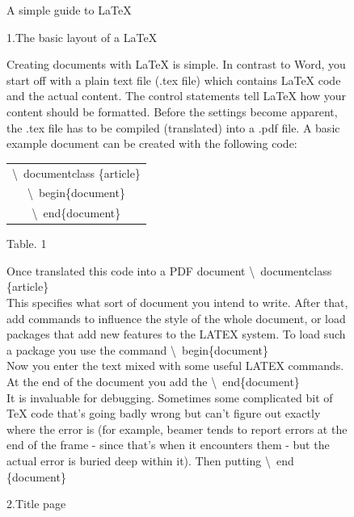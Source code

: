 \documentclass[onecolumn,journal] {IEEEtran}
\begin{document}
\begin{figure}

\begin{Large}
 A simple guide to LaTeX
\end{Large}
\newline
\newline
\begin{Large}
1.The basic layout of a LaTeX
\end{Large}
\newline
\newline
Creating documents with LaTeX is simple. In contrast to Word, you start off with a plain text file (.tex file) which contains LaTeX code and the actual content. The control statements tell LaTeX how your content should be formatted. Before the settings become apparent, the .tex file has to be compiled (translated) into a .pdf file. A basic example document can be created with the following code:\\
\begin{center}
\begin{tabular}{ |c| } 
 \hline

\textbackslash \ documentclass \{article\}\\
\textbackslash \ begin\{document\}\\
\textbackslash \ end\{document\} \\
 \hline

\end{tabular}
\end{center}
\begin{center}
Table. 1 \\
\end{center}
 Once  translated this code into a PDF document   
\textbackslash \ documentclass \{article\}\\
This specifies what sort of document you intend to write. After that, add
commands to influence the style of the whole document, or load packages
that add new features to the LATEX system. To load such a package you use
the command 
\newline
\newline
\textbackslash \ begin\{document\}\\
Now you enter the text mixed with some useful LATEX commands. At
the end of the document you add the
\newline
\newline
\textbackslash \ end\{document\} \\
It is invaluable for debugging. Sometimes  some complicated bit of TeX code that's going badly wrong but  can't figure out exactly where the error is (for example, beamer tends to report errors at the end of the frame - since that's when it encounters them - but the actual error is buried deep within it). Then putting \textbackslash  \ end \{document\} \\
\newline
\begin{Large}
2.Title page\\  %
\end{Large}


\end{figure}
\end{document}
